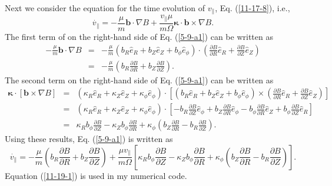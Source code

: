 \documentclass{article}
\begin{document}
Next we consider the equation for the time evolution of $v_{\parallel}$, Eq.
(\ref{11-17-8}), i.e.,
\begin{equation}
  \label{5-9-a1} \dot{v_{\parallel}} = - \frac{\mu}{m} \mathbf{b} \cdot \nabla
  B + \frac{v_{\parallel} \mu}{m \Omega} \mathbf{\kappa} \cdot \mathbf{b}
  \times \nabla B.
\end{equation}
The first term of on the right-hand side of Eq. (\ref{5-9-a1}) can be written
as
\begin{eqnarray}
  - \frac{\mu}{m} \mathbf{b} \cdot \nabla B & = & - \frac{\mu}{m}  (b_R
  \hat{e}_R + b_Z \hat{e}_Z + b_{\phi} \hat{e}_{\phi}) \cdot \left(
  \frac{\partial B}{\partial R} \hat{e}_R + \frac{\partial B}{\partial Z}
  \hat{e}_Z \right) \nonumber\\
  & = & - \frac{\mu}{m}  \left( b_R  \frac{\partial B}{\partial R} + b_Z 
  \frac{\partial B}{\partial Z} \right) . 
\end{eqnarray}
The second term on the right-hand side of Eq. (\ref{5-9-a1}) can be written as
\begin{eqnarray}
  \mathbf{\kappa} \cdot [\mathbf{b} \times \nabla B] & = & (\kappa_R \hat{e}_R
  + \kappa_Z \hat{e}_Z + \kappa_{\phi} \hat{e}_{\phi}) \cdot \left[ (b_R
  \hat{e}_R + b_Z \hat{e}_Z + b_{\phi} \hat{e}_{\phi}) \times \left(
  \frac{\partial B}{\partial R} \hat{e}_R + \frac{\partial B}{\partial Z}
  \hat{e}_Z \right) \right] \nonumber\\
  & = & (\kappa_R \hat{e}_R + \kappa_Z \hat{e}_Z + \kappa_{\phi}
  \hat{e}_{\phi}) \cdot \left[ - b_R \frac{\partial B}{\partial Z}
  \hat{e}_{\phi} + b_Z \frac{\partial B}{\partial R} \hat{e}_{\phi} - b_{\phi}
  \frac{\partial B}{\partial R} \hat{e}_Z + b_{\phi} \frac{\partial
  B}{\partial Z} \hat{e}_R \right] \nonumber\\
  & = & \kappa_R b_{\phi}  \frac{\partial B}{\partial Z} - \kappa_Z b_{\phi} 
  \frac{\partial B}{\partial R} + \kappa_{\phi} \left( b_Z \frac{\partial
  B}{\partial R} - b_R \frac{\partial B}{\partial Z} \right) . 
\end{eqnarray}
Using these results, Eq. (\ref{5-9-a1}) is written as
\begin{equation}
  \label{11-19-1} \dot{v_{\parallel}} = - \frac{\mu}{m}  \left( b_R 
  \frac{\partial B}{\partial R} + b_Z  \frac{\partial B}{\partial Z} \right) +
  \frac{\mu v_{\parallel}}{m \Omega} \left[ \kappa_R b_{\phi}  \frac{\partial
  B}{\partial Z} - \kappa_Z b_{\phi}  \frac{\partial B}{\partial R} +
  \kappa_{\phi} \left( b_Z \frac{\partial B}{\partial R} - b_R \frac{\partial
  B}{\partial Z} \right) \right] .
\end{equation}
Equation (\ref{11-19-1}) is used in my numerical code.
\end{document}
